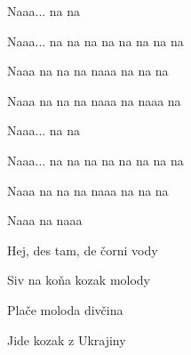 \begin{song}
\bigskip

\Refren

\bigskip


 \par
{}Naaa...   na na \par
{}Naaa... na na na na na na na na \par
{}Naaa na na na naaa na na na \par
{}Naaa na na na naaa na naaa na \par

\bigskip

Naaa...   na na \par
{}Naaa... na na na na na na na na \par
{}Naaa na na na naaa na na na \par
{}Naaa na naaa  \par

\bigskip



 \par
{}Hej, des tam, de čorni vody \par
{}Siv na koňa kozak molody \par
{}Plače moloda divčina \par
{}Jide kozak z Ukrajiny \par

\bigskip

\Refren

\end{song}
